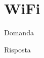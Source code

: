 \section{WiFi}

\begin{questions}
    \question Domanda
    
    \begin{solution}
        Risposta
    \end{solution}
\end{questions}